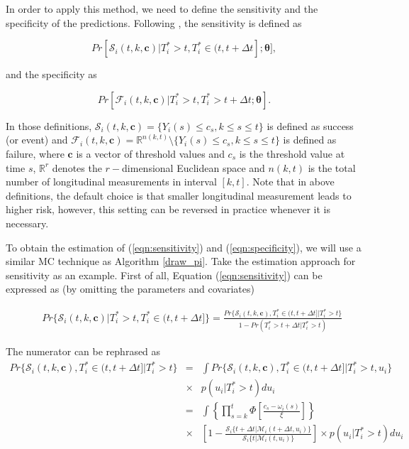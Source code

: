 In order to apply this method, we need to define the sensitivity and the specificity of the predictions. Following \cite{rizopoulos2011dynamic}, the sensitivity is defined as

\begin{equation}\label{eqn:sensitivity}
Pr[\mathcal{S}_i(t,k,\boldsymbol{c})|T_i^*>t, T_i^*\in (t, t+\Delta t];\boldsymbol{\theta}],
\end{equation}

and the specificity as 

\begin{equation}\label{eqn:specificity}
Pr[\mathcal{F}_i(t,k,\boldsymbol{c})|T_i^*>t, T_i^* > t+\Delta t;\boldsymbol{\theta}].
\end{equation}

In those definitions, $\mathcal{S}_i(t,k,{\boldsymbol c})=\{Y_i(s)\le c_s, k\le s\le t\}$ is defined as success (or event) and $\mathcal{F}_i(t,k,\boldsymbol{c})=\mathbb{R}^{n(k,t)}\setminus\{Y_i(s)\le c_s, k\le s\le t\}$ is defined as failure, where $\boldsymbol{c}$ is a vector of threshold values and $c_s$ is the threshold value at time $s$, $\mathbb{R}^r$ denotes the $r-$dimensional Euclidean space and $n(k,t)$ is the total number of longitudinal measurements in interval $[k,t]$. Note that in above definitions, the default choice is that smaller longitudinal measurement leads to higher risk, however, this setting can be reversed in practice whenever it is necessary. \par

To obtain the estimation of (\ref{eqn:sensitivity}) and (\ref{eqn:specificity}), we will use a similar MC technique as Algorithm \ref{draw_pi}. Take the estimation approach for sensitivity as an example. First of all, Equation (\ref{eqn:sensitivity}) can be expressed as (by omitting the parameters and covariates)

\begin{eqnarray*}
&&Pr\{\mathcal{S}_i(t,k,\boldsymbol{c})|T_i^*>t, T_i^*\in (t, t+\Delta t]\}=\frac{Pr\{\mathcal{S}_i(t,k,\boldsymbol{c}),T_i^*\in (t, t+\Delta t]|T_i^*>t\}}{1- Pr(T_i^* > t+\Delta t|T_i^*>t)}
\end{eqnarray*}

The numerator can be rephrased as
\begin{eqnarray}\label{eqn:sen_num}
\nonumber Pr\{\mathcal{S}_i(t,k,\boldsymbol{c}),T_i^*\in (t, t+\Delta t]|T_i^*>t\}&=&\int Pr\{\mathcal{S}_i(t,k,\boldsymbol{c}),T_i^*\in (t, t+\Delta t]|T_i^*>t, u_i\}\\
\nonumber &\times& p(u_i|T^*_i>t)du_i\\
\nonumber &=&\int\left\{\prod_{s=k}^t\Phi\left[\frac{c_s-\omega_i(s)}{\xi}\right]\right\}\\
&\times&\left[1-\frac{\mathcal{S}_i\{t+\Delta t|\mathcal{M}_i(t+\Delta t, u_i)\}}{\mathcal{S}_i\{t|\mathcal{M}_i(t,u_i)\}}\right]\times p(u_i|T^*_i>t)du_i
\end{eqnarray}

